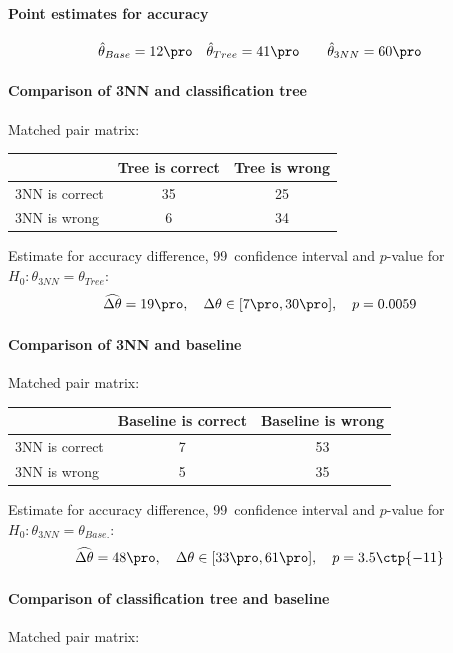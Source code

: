 \documentclass[11pt,fleqn]{article}
\begin{document}
\paragraph{Point estimates for accuracy}

\begin{align*}
	& \hat \theta_{Base}= 12\pro 
	&& \hat \theta_{Tree} =41\pro 
	&&&\hat \theta_{3NN} = 60 \pro 
\end{align*}
\paragraph{Comparison of 3NN and classification tree}
Matched pair matrix:

\begin{table}[H]
	\centering
	\begin{tabular}{l|c c}
		&Tree is correct& Tree is wrong \\
		\hline
		3NN is correct &35& 25\\
		3NN is wrong& 6& 34
	\end{tabular}
\end{table}\noindent 
Estimate for accuracy difference, 99\pro\ confidence interval and \(p\)-value for \(H_0: \theta_{3NN}=\theta_{Tree}\):
\[
\widehat{\Delta \theta} = 19\pro,\quad  \Delta \theta\in[7\pro , 30\pro], \quad p = 0.0059 
\]

\paragraph{Comparison of 3NN and baseline}
Matched pair matrix:

\begin{table}[H]
	\centering
	\begin{tabular}{l|c c}
		&Baseline is correct& Baseline is wrong \\
		\hline
		3NN is correct &7& 53\\
		3NN is wrong& 5& 35
	\end{tabular}
\end{table}\noindent 
Estimate for accuracy difference, 99\pro\ confidence interval and \(p\)-value for \(H_0: \theta_{3NN}=\theta_{Base.}\):
\[
\widehat{\Delta \theta} = 48\pro,\quad  \Delta \theta\in[33\pro , 61\pro], \quad p = 3.5\ctp{-11}
\]
\paragraph{Comparison of classification tree and baseline}
Matched pair matrix:
\end{document}
